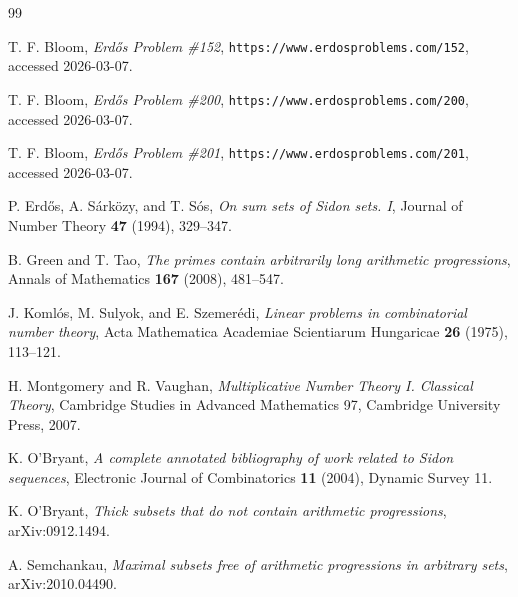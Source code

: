 \begin{thebibliography}{99}

T. F. Bloom,
\emph{Erd\H{o}s Problem \#152},
\texttt{https://www.erdosproblems.com/152}, accessed 2026-03-07.

T. F. Bloom,
\emph{Erd\H{o}s Problem \#200},
\texttt{https://www.erdosproblems.com/200}, accessed 2026-03-07.

T. F. Bloom,
\emph{Erd\H{o}s Problem \#201},
\texttt{https://www.erdosproblems.com/201}, accessed 2026-03-07.

P. Erd\H{o}s, A. S\'ark\"ozy, and T. S\'os,
\emph{On sum sets of Sidon sets. I},
Journal of Number Theory \textbf{47} (1994), 329--347.

B. Green and T. Tao,
\emph{The primes contain arbitrarily long arithmetic progressions},
Annals of Mathematics \textbf{167} (2008), 481--547.

J. Koml\'os, M. Sulyok, and E. Szemer\'edi,
\emph{Linear problems in combinatorial number theory},
Acta Mathematica Academiae Scientiarum Hungaricae \textbf{26} (1975), 113--121.

H. Montgomery and R. Vaughan,
\emph{Multiplicative Number Theory I. Classical Theory},
Cambridge Studies in Advanced Mathematics 97, Cambridge University Press, 2007.

K. O'Bryant,
\emph{A complete annotated bibliography of work related to Sidon sequences},
Electronic Journal of Combinatorics \textbf{11} (2004), Dynamic Survey 11.

K. O'Bryant,
\emph{Thick subsets that do not contain arithmetic progressions},
arXiv:0912.1494.

A. Semchankau,
\emph{Maximal subsets free of arithmetic progressions in arbitrary sets},
arXiv:2010.04490.

\end{thebibliography}
